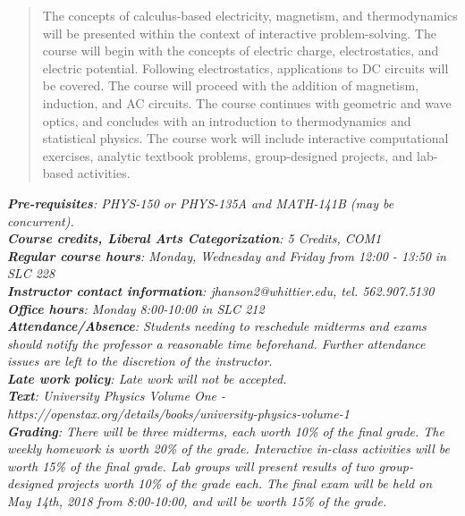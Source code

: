 \documentclass[10pt]{article}
\begin{document}
\maketitle

\begin{abstract}
The concepts of calculus-based electricity, magnetism, and thermodynamics will be presented within the context of interactive problem-solving.  The course will begin with the concepts of electric charge, electrostatics, and electric potential.  Following electrostatics, applications to DC circuits will be covered.  The course will proceed with the addition of magnetism, induction, and AC circuits.  The course continues with geometric and wave optics, and concludes with an introduction to thermodynamics and statistical physics.  The course work will include interactive computational exercises, analytic textbook problems, group-designed projects, and lab-based activities.
\end{abstract}
\noindent
\textit{\textbf{Pre-requisites}: PHYS-150 or PHYS-135A and MATH-141B (may be concurrent).} \\
\textit{\textbf{Course credits, Liberal Arts Categorization}: 5 Credits, COM1} \\
\textit{\textbf{Regular course hours}: Monday, Wednesday and Friday from 12:00 - 13:50 in SLC 228} \\
\textit{\textbf{Instructor contact information}: jhanson2@whittier.edu, tel. 562.907.5130} \\
\textit{\textbf{Office hours}: Monday 8:00-10:00 in SLC 212} \\
\textit{\textbf{Attendance/Absence}: Students needing to reschedule midterms and exams should notify the professor a reasonable time beforehand. Further attendance issues are left to the discretion of the instructor}.\\ 
\textit{\textbf{Late work policy}: Late work will not be accepted.} \\
\textit{\textbf{Text}: University Physics Volume One - https://openstax.org/details/books/university-physics-volume-1} \\
\textit{\textbf{Grading}: There will be three midterms, each worth 10\% of the final grade.  The weekly homework is worth 20\% of the grade.  Interactive in-class activities will be worth 15\% of the final grade.  Lab groups will present results of two group-designed projects worth 10\% of the grade each.  The final exam will be held on May 14th, 2018 from 8:00-10:00, and will be worth 15\% of the grade.} \\
\end{document}
